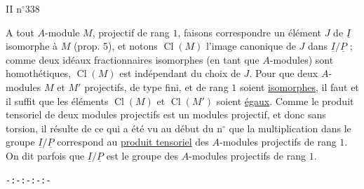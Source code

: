 II  \hfill n$^\circ$338

A tout $A$-module $M$, projectif de rang $1$, faisons correspondre un élément $J$ de $\underline{I}$ isomorphe à $M$ (prop. 5), et notons $\operatorname{Cl}(M)$ l'image canonique de $J$ dans $\underline{I}/\underline{P}$ ; comme deux idéaux fractionnaires isomorphes (en tant que $A$-modules) sont homothétiques, $\operatorname{Cl}(M)$ est indépendant du choix de $J$. Pour que deux $A$-modules $M$ et $M'$ projectifs, de type fini, et de rang $1$ soient \uline{isomorphes}, il faut et il suffit que les éléments $\operatorname{Cl}(M)$ et $\operatorname{Cl}(M')$ soient \uline{égaux}. Comme le produit tensoriel de deux modules projectifs est un modules projectif, et donc sans torsion, il résulte de ce qui a été vu au début du n$^\circ$ que la multiplication dans le groupe $\underline{I}/\underline{P}$ correspond au \uline{produit tensoriel} des $A$-modules projectifs de rang $1$. On dit parfois que $\underline{I}/\underline{P}$ est le groupe des $A$-modules projectifs de rang $1$.

\begin{center}\texttt{-:-:-:-:-}\end{center}
